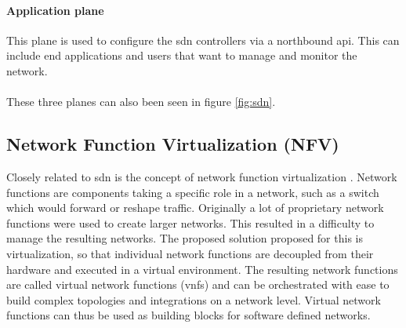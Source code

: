 \paragraph{Application plane} This plane is used to configure the \acrshort{sdn} controllers via a northbound \acrshort{api}. This can include end applications and users that want to manage and monitor the network.

\paragraph{}These three planes can also been seen in figure \ref{fig:sdn}.

\subsection{Network Function Virtualization (NFV)}
Closely related to \acrshort{sdn} is the concept of network function virtualization \cite{nfv}. Network functions are components taking a specific role in a network, such as a switch which would forward or reshape traffic. Originally a lot of proprietary network functions were used to create larger networks. This resulted in a difficulty to manage the resulting networks. The proposed solution proposed for this is virtualization, so that individual network functions are decoupled from their hardware and executed in a virtual environment. The resulting network functions are called virtual network functions (\acrshort{vnf}s) and can be orchestrated with ease to build complex topologies and integrations on a network level. Virtual network functions can thus be used as building blocks for software defined networks.

